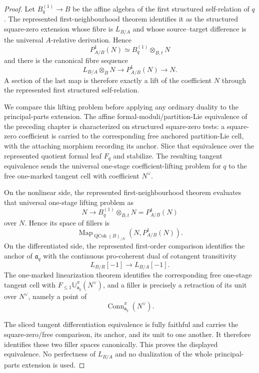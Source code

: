 \begin{proof}
Let $B_q^{(1)}\to B$ be the affine algebra of the first structured
self-relation of $q$.  The represented first-neighbourhood theorem identifies
it as the structured square-zero extension whose fibre is $L_{B/A}$ and whose
source--target difference is the universal $A$-relative derivation.  Hence
\[
    P^1_{A/B}(N)
    \simeq
    B_q^{(1)}\otimes_{B,t}N
\]
and there is the canonical fibre sequence
\[
    L_{B/A}\otimes_BN
    \longrightarrow
    P^1_{A/B}(N)
    \longrightarrow
    N.
\]
A section of the last map is therefore exactly a lift of the coefficient
$N$ through the represented first structured self-relation.

We compare this lifting problem before applying any ordinary duality to the
principal-parts extension.  The affine formal-moduli/partition-Lie
equivalence of the preceding chapter is characterized on structured
square-zero tests: a square-zero coefficient is carried to the corresponding
free anchored partition-Lie cell, with the attaching morphism recording its
anchor.  Slice that equivalence over the represented quotient formal leaf
$F_q$ and stabilize.  The resulting tangent equivalence sends the universal
one-stage coefficient-lifting problem for $q$ to the free one-marked tangent
cell with coefficient $N^\vee$.

On the nonlinear side, the represented first-neighbourhood theorem evaluates
that universal one-stage lifting problem as
\[
    N\longrightarrow
    B_q^{(1)}\otimes_{B,t}N=P^1_{A/B}(N)
\]
over $N$.  Hence its space of fillers is
\[
    \operatorname{Map}_{\operatorname{QCoh}(B)_{/N}}
    \left(N,P^1_{A/B}(N)\right).
\]
On the differentiated side, the represented first-order comparison
identifies the anchor of $\mathfrak a_q$ with the continuous pro-coherent
dual of cotangent transitivity
\[
    L_{B/R}[-1]\longrightarrow L_{B/A}[-1].
\]
The one-marked linearization theorem identifies the corresponding free
one-stage tangent cell with
$F_{\le1}\mathbb U_{\mathfrak a_q}^{\pi}(N^\vee)$, and a filler is precisely
a retraction of its unit over $N^\vee$, namely a point of
\[
    \operatorname{Conn}_{\mathfrak a_q}^{\pi}(N^\vee).
\]

The sliced tangent differentiation equivalence is fully faithful and carries
the square-zero/free comparison, its anchor, and its unit to one another.
It therefore identifies these two filler spaces canonically.  This proves the
displayed equivalence.  No perfectness of $L_{B/A}$ and no dualization of the
whole principal-parts extension is used.
\end{proof}

